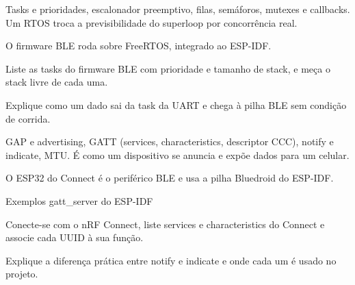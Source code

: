 Tasks e prioridades, escalonador preemptivo, filas, semáforos, mutexes e callbacks. Um RTOS troca a previsibilidade do superloop por concorrência real.

\begin{noproduto}
O firmware BLE roda sobre FreeRTOS, integrado ao ESP-IDF.
\end{noproduto}

\begin{paraestudar}
  \item {}
\end{paraestudar}

\begin{pratique}
  \item Liste as tasks do firmware BLE com prioridade e tamanho de stack, e meça o stack livre de cada uma.
  \item Explique como um dado sai da task da UART e chega à pilha BLE sem condição de corrida.
\end{pratique}

GAP e advertising, GATT (services, characteristics, descriptor CCC), notify e indicate, MTU. É como um dispositivo se anuncia e expõe dados para um celular.

\begin{noproduto}
O ESP32 do Connect é o periférico BLE e usa a pilha Bluedroid do ESP-IDF.
\end{noproduto}

\begin{paraestudar}
  \item {}
  \item {}
  \item Exemplos gatt\_server do ESP-IDF
\end{paraestudar}

\begin{pratique}
  \item Conecte-se com o nRF Connect, liste services e characteristics do Connect e associe cada UUID à sua função.
  \item Explique a diferença prática entre notify e indicate e onde cada um é usado no projeto.
\end{pratique}

